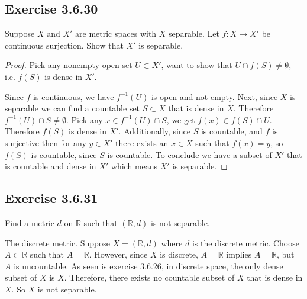 \documentclass{tufte-book}
\theoremstyle{mytheoremstyle}
\theoremstyle{mylemstyle}
\theoremstyle{mydefstyle}
\begin{document}
\subsection{Exercise 3.6.30}
Suppose $X$ and $X'$ are metric spaces with $X$ separable.  Let $f:X \to X'$ be continuous surjection.  Show that $X'$ is separable.
\begin{proof}
Pick any nonempty open set $U \subset X'$, want to show that $U \cap f(S) \neq \emptyset$, i.e. $f(S)$ is dense in $X'$.

Since $f$ is continuous, we have $f^{-1}(U)$ is open and not empty.  Next, since $X$ is separable we can find a countable set $S \subset X$ that is dense in $X$. Therefore $f^{-1}(U) \cap S \neq \emptyset$.  Pick any $x \in f^{-1}(U) \cap S$, we get $f(x) \in f(S) \cap U$.  Therefore $f(S)$ is dense in $X'$.  Additionally, since $S$ is countable, and $f$ is surjective then for any $y \in X'$ there exists an $x \in X$ such that $f(x) = y$, so $f(S)$ is countable, since $S$ is countable.  To conclude we have a subset of $X'$ that is countable and dense in $X'$ which means $X'$ is separable. 
\end{proof}

\subsection{Exercise 3.6.31}
Find a metric $d$ on $\mathbb{R}$ such that $(\mathbb{R}, d)$ is not separable.

The discrete metric.  Suppose $X = (\mathbb{R}, d)$ where $d$ is the discrete metric.  Choose $A \subset \mathbb{R}$ such that $\overline{A}= \mathbb{R}$.  However, since $X$ is discrete,  $\overline{A}= \mathbb{R}$ implies $A = \mathbb{R}$, but $A$ is uncountable.  As seen is exercise 3.6.26, in discrete space, the only dense subset of $X$ is $X$. Therefore, there exists no countable subset of $X$ that is dense in $X$.  So $X$ is not separable.
\end{document}
